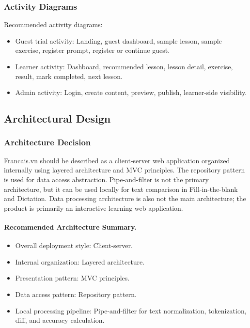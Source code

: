\subsubsection{Activity Diagrams}

Recommended activity diagrams:

\begin{itemize}[leftmargin=*]
  \item Guest trial activity: Landing, guest dashboard, sample lesson, sample exercise, register prompt, register or continue guest.
  \item Learner activity: Dashboard, recommended lesson, lesson detail, exercise, result, mark completed, next lesson.
  \item Admin activity: Login, create content, preview, publish, learner-side visibility.
\end{itemize}


\subsection{Architectural Design}

\subsubsection{Architecture Decision}

Francais.vn should be described as a client-server web application organized internally using layered architecture and MVC principles. The repository pattern is used for data access abstraction. Pipe-and-filter is not the primary architecture, but it can be used locally for text comparison in Fill-in-the-blank and Dictation. Data processing architecture is also not the main architecture; the product is primarily an interactive learning web application.

\paragraph{Recommended Architecture Summary.}
\begin{itemize}[leftmargin=*]
  \item Overall deployment style: Client-server.
  \item Internal organization: Layered architecture.
  \item Presentation pattern: MVC principles.
  \item Data access pattern: Repository pattern.
  \item Local processing pipeline: Pipe-and-filter for text normalization, tokenization, diff, and accuracy calculation.
\end{itemize}

